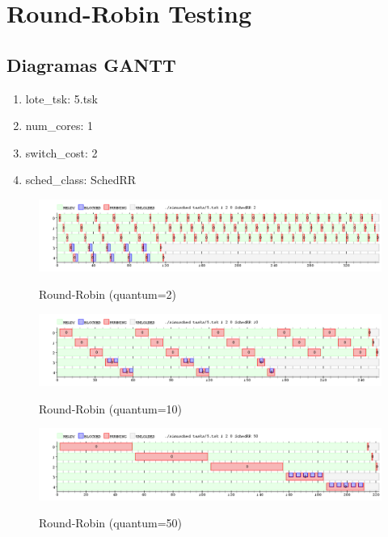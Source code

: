 \section{Round-Robin Testing}

\subsection{Diagramas GANTT}

\begin{enumerate}
	\item lote\_tsk: 5.tsk
	\item num\_cores: 1
	\item switch\_cost: 2
	\item sched\_class: SchedRR
\end{enumerate}

\begin{figure}[h]
    \includegraphics[width=\linewidth]{images/5_quantum2.png}
    \label{fig:Task Consola}
    \caption{Round-Robin (quantum=2)}
\end{figure}

\begin{figure}[h]
    \includegraphics[width=\linewidth]{images/5_quantum10.png}
    \label{fig:Task Consola}
    \caption{Round-Robin (quantum=10)}
\end{figure}

\begin{figure}[h]
    \includegraphics[width=\linewidth]{images/5_quantum50.png}
    \label{fig:Task Consola}
    \caption{Round-Robin (quantum=50)}
\end{figure}

